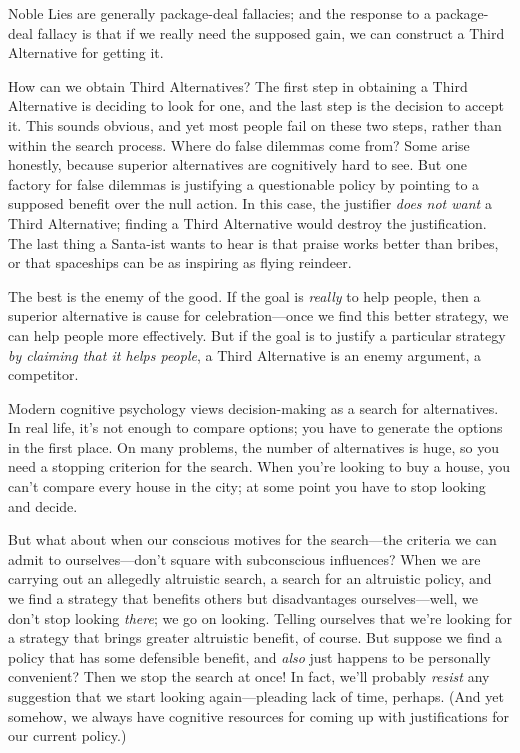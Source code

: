 {
 Noble Lies are generally package-deal fallacies; and the response
to a package-deal fallacy is that if we really need the supposed gain,
we can construct a Third Alternative for getting it.}

{
 How can we obtain Third Alternatives? The first step in obtaining
a Third Alternative is deciding to look for one, and the last step is
the decision to accept it. This sounds obvious, and yet most people
fail on these two steps, rather than within the search process. Where
do false dilemmas come from? Some arise honestly, because superior
alternatives are cognitively hard to see. But one factory for false
dilemmas is justifying a questionable policy by pointing to a supposed
benefit over the null action. In this case, the justifier \textit{does
not want} a Third Alternative; finding a Third Alternative would
destroy the justification. The last thing a Santa-ist wants to hear is
that praise works better than bribes, or that spaceships can be as
inspiring as flying reindeer.}

{
 The best is the enemy of the good. If the goal is \textit{really}
to help people, then a superior alternative is cause for
celebration---once we find this better strategy, we can help people
more effectively. But if the goal is to justify a particular strategy
\textit{by claiming that it helps people}, a Third Alternative is an
enemy argument, a competitor.}

{
 Modern cognitive psychology views decision-making as a search for
alternatives. In real life, it's not enough to compare
options; you have to generate the options in the first place. On many
problems, the number of alternatives is huge, so you need a stopping
criterion for the search. When you're looking to buy a
house, you can't compare every house in the city; at
some point you have to stop looking and decide.}

{
 But what about when our conscious motives for the search---the
criteria we can admit to ourselves---don't square with
subconscious influences? When we are carrying out an allegedly
altruistic search, a search for an altruistic policy, and we find a
strategy that benefits others but disadvantages ourselves---well, we
don't stop looking \textit{there}; we go on looking.
Telling ourselves that we're looking for a strategy
that brings greater altruistic benefit, of course. But suppose we find
a policy that has some defensible benefit, and \textit{also} just
happens to be personally convenient? Then we stop the search at once!
In fact, we'll probably \textit{resist} any suggestion
that we start looking again---pleading lack of time, perhaps. (And yet
somehow, we always have cognitive resources for coming up with
justifications for our current policy.)}


